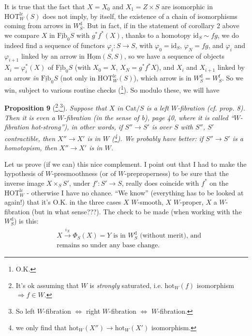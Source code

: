 \documentclass[11pt]{article}
\newcommand{\msp}[1]{\marginpar{\footnotesize [#1]}}
\newcommand{\HOTlc}{\mathrm{HOT}^{\mathrm{lc}}_W}
\newcommand{\hot}{\mathrm{hot}}
\newcommand{\id}{\mathrm{id}}
\newcommand{\Wd}{W^{\mathrm{d}}_S}
\newcommand{\Wf}{W^{\mathrm{f}}_S}
\begin{document}
It is true that the fact that $X = X_0$ and $X_1 = Z \times S$ are isomorphic in $\HOTlc(S)$ does not imply, by itself, the existence of a \msp{page 48} chain of isomorphisms coming from arrows in $\Wd$. But in fact, if in the statement of corollary 2 above we compare $X$ in $\underline{\mathrm{Fib}}_0S$ with $g^*f^*(X)$, thanks to a homotopy $\id_S \sim fg$, we do indeed find a sequence of functors $\varphi_i : S \longrightarrow S$, with $\varphi_0 = \id_S$, $\varphi_N = fg$, and $\varphi_i$ and $\varphi_{i+1}$ linked by an arrow in $\underline{\mathrm{Hom}}(S,S)$, so we have a sequence of objects $X_i = \varphi_i^*(X)$ of $\underline{\mathrm{Fib}}_0S$ (with $X_0 = X$, $X_N = g^*f^*X$), and $X_i$ and $X_{i+1}$ linked by an arrow \textit{in} $\underline{\mathrm{Fib}}_0S$ (not only in $\HOTlc(S)$), which arrow is in $\Wd = \Wf$. So we win, subject to various routine checks (\footnote[55]{O.K.}). So modulo these, we will have

\textbf{Proposition 9} (\footnote[56]{It's ok assuming that $W$ is \textit{strongly} saturated, i.e. $\hot_W(f)$ isomorphism $\Longrightarrow f \in W$.},\footnote[57]{So left $W$-fibration $\Longleftrightarrow$ right $W$-fibration $\Longleftrightarrow$ $W$-fibration.}). \textit{Suppose that $X$ in $\mathrm{Cat}/S$ is a left $W$-fibration (cf. prop. 8). Then it is even a $W$-fibration (in the sense of b), page 40, where it is called ``$W$-fibration \textup{hot}-strong''), in other words, if $S'' \longrightarrow S'$ is over $S$ with $S''$, $S'$ contractible, then $X'' \longrightarrow X'$ is in $W$ (\footnote[58]{we only find that $\hot_W(X'') \longrightarrow \hot_W(X')$ isomorphism.}). We probably have better: if $S'' \longrightarrow S'$ is a homotopism, then $X'' \longrightarrow X'$ is in $W$.}

\msp{page 49}
Let us prove (if we can) this nice complement. I point out that I had to make the hypothesis of $W$-presmoothness (or of $W$-preproperness) to be sure that the inverse image $X \times_S S'$, under $f' : S' \longrightarrow S$, really does coincide with $f^*$ on the $\HOTlc$ - otherwise I have no chance. %
``We know'' (everything has to be looked at again!) that it's O.K. in the three cases $X$ $W$-smooth, $X$ $W$-proper, $X$ a $W$-fibration (but in what sense???). The check to be made (when working with the $\Wd$) is this:
\[ \begin{aligned}
&X \xrightarrow{i_X} \Phi_S(X) = Y \text{ is in } \Wd \text{ (without merit), and} \\
&\text{remains so under any base change.}
\end{aligned} \tag*{$(*)$} \]
\end{document}
